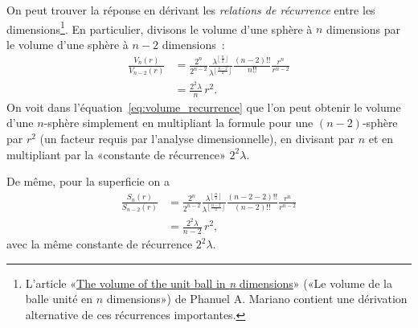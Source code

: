 On peut trouver la réponse en dérivant les \emph{relations de récurrence} entre
les dimensions\ns\footnote{L'article
«\ns \href{http://www2.math.uconn.edu/~mariano/research/MathClubsp14\%20.pdf}{The
volume of the unit ball in \emph{n} dimensions}\ns » («\ns Le volume de la balle
unité en $n$ dimensions\ns ») de Phanuel A. Mariano contient une dérivation
alternative de ces récurrences importantes.}. En particulier, divisons le
volume d'une sphère à $n$ dimensions par le volume d'une sphère à $n-2$
dimensions~:
\begin{equation}
\label{eq:volume_recurrence}
\begin{split}
\frac{V_n(r)}{V_{n-2}(r)} & =
\frac{2^n}{2^{n-2}}
\frac{\lambda^{\left\lfloor \frac{n}{2} \right\rfloor}}{\lambda^{\left\lfloor \frac{n-2}{2} \right\rfloor}}
\frac{(n-2)!!}{n!!}
\frac{r^{n}}{r^{n-2}}
\\ & = \frac{2^2\lambda}{n}\,r^2.
\end{split}
\end{equation}
On voit dans l'équation~\eqref{eq:volume_recurrence} que l'on peut obtenir le
volume d'une $n$-sphère simplement en multipliant la formule pour une
$(n-2)$-sphère par $r^2$ (un facteur requis par l'analyse dimensionnelle), en
divisant par $n$ et en multipliant par la «\ns constante de récurrence\ns »
$2^2\lambda$.

De même, pour la superficie on a
\begin{equation}
\label{eq:surface_area_recurrence}
\begin{split}
\frac{S_n(r)}{S_{n-2}(r)} & =
\frac{2^n}{2^{n-2}}
\frac{\lambda^{\left\lfloor \frac{n}{2} \right\rfloor}}{\lambda^{\left\lfloor \frac{n-2}{2} \right\rfloor}}
\frac{(n-2-2)!!}{(n-2)!!}
\frac{r^{n}}{r^{n-2}}
\\ & = \frac{2^2\lambda}{n-2}\,r^2,
\end{split}
\end{equation}
avec la même constante de récurrence $2^2\lambda$.

